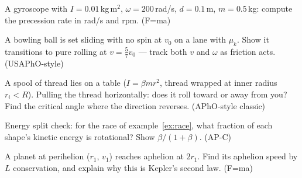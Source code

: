 \begin{exercise}[medium]
A gyroscope with $I=0.01$\,kg\,m$^{2}$, $\omega=200$\,rad/s, $d=0.1$\,m,
$m=0.5$\,kg: compute the precession rate in rad/s and rpm. (F=ma)
\end{exercise}
\begin{exercise}[hard]
A bowling ball is set sliding with no spin at $v_0$ on a lane with
$\mu_k$. Show it transitions to pure rolling at $v=\frac{5}{7}v_0$ ---
track both $v$ and $\omega$ as friction acts. (USAPhO-style)
\end{exercise}
\begin{exercise}[hard]
A spool of thread lies on a table ($I=\beta mr^{2}$, thread wrapped at
inner radius $r_i<R$). Pulling the thread horizontally: does it roll
toward or away from you? Find the critical angle where the direction
reverses. (APhO-style classic)
\end{exercise}
\begin{exercise}[medium]
Energy split check: for the race of example~\ref{ex:race}, what fraction
of each shape's kinetic energy is rotational? Show $\beta/(1+\beta)$.
(AP-C)
\end{exercise}
\begin{exercise}[medium]
A planet at perihelion ($r_1$, $v_1$) reaches aphelion at $2r_1$. Find
its aphelion speed by $L$ conservation, and explain why this is Kepler's
second law. (F=ma)
\end{exercise}
